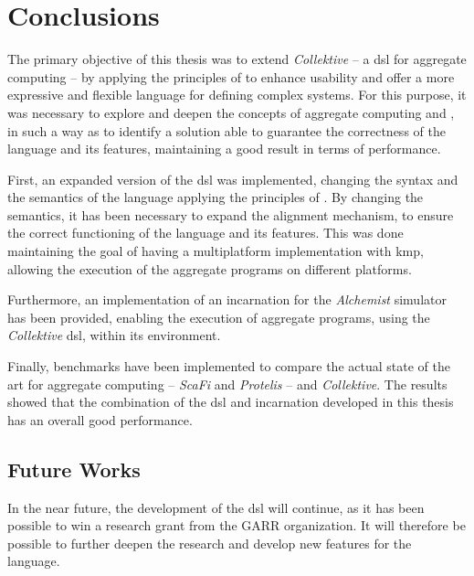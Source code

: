 
\chapter{Conclusions}
\label{ch:conclusions}

The primary objective of this thesis was to extend \emph{Collektive} -- a \ac{dsl} for aggregate computing --
by applying the principles of \xc{} to enhance usability and offer a more expressive and flexible
language for defining complex systems.
For this purpose, it was necessary to explore and deepen the concepts of aggregate computing and \xc{},
in such a way as to identify a solution able to guarantee the correctness of the language and its features,
maintaining a good result in terms of performance.

First, an expanded version of the \ac{dsl} was implemented, changing the syntax and the semantics of the language
applying the principles of \xc{}.
By changing the semantics, it has been necessary to expand the alignment mechanism, to ensure the correct functioning
of the language and its features.
This was done maintaining the goal of having a multiplatform implementation with \ac{kmp}, allowing the execution of the
aggregate programs on different platforms.

Furthermore, an implementation of an incarnation for the \emph{Alchemist} simulator has been provided,
enabling the execution of aggregate programs, using the \emph{Collektive} \ac{dsl}, within its environment.

Finally, benchmarks have been implemented to compare the actual state of the art for aggregate computing
-- \emph{ScaFi} and \emph{Protelis} -- and \emph{Collektive}.
The results showed that the combination of the \ac{dsl} and incarnation developed in this thesis has an overall good
performance.

\section{Future Works}
\label{sec:future-works}
In the near future, the development of the \ac{dsl} will continue, as it has been possible to win a research grant from the GARR organization.
It will therefore be possible to further deepen the research and develop new features for the language.

